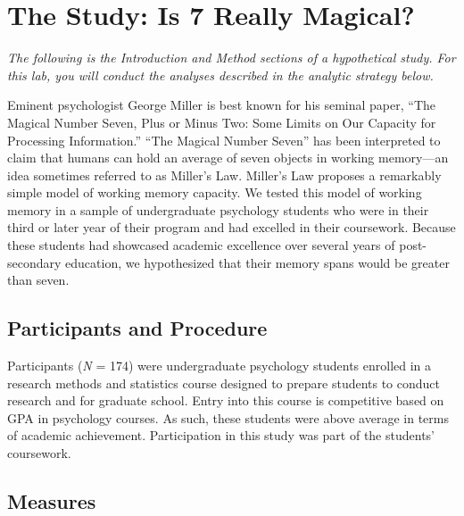 \documentclass[
]{book}
\begin{document}
\hypertarget{ost-study}{%
\section{The Study: Is 7 Really Magical?}\label{ost-study}}

\emph{The following is the Introduction and Method sections of a hypothetical study. For this lab, you will conduct the analyses described in the analytic strategy below.}

Eminent psychologist George Miller is best known for his seminal paper, ``The Magical Number Seven, Plus or Minus Two: Some Limits on Our Capacity for Processing Information.'' ``The Magical Number Seven'' has been interpreted to claim that humans can hold an average of seven objects in working memory---an idea sometimes referred to as Miller's Law. Miller's Law proposes a remarkably simple model of working memory capacity. We tested this model of working memory in a sample of undergraduate psychology students who were in their third or later year of their program and had excelled in their coursework. Because these students had showcased academic excellence over several years of post-secondary education, we hypothesized that their memory spans would be greater than seven.

\hypertarget{participants-and-procedure}{%
\subsection*{Participants and Procedure}\label{participants-and-procedure}}

Participants (\emph{N} = 174) were undergraduate psychology students enrolled in a research methods and statistics course designed to prepare students to conduct research and for graduate school. Entry into this course is competitive based on GPA in psychology courses. As such, these students were above average in terms of academic achievement. Participation in this study was part of the students' coursework.

\hypertarget{measures}{%
\subsection*{Measures}\label{measures}}
\end{document}
